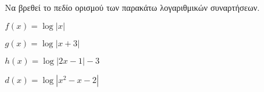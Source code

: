Να βρεθεί το πεδίο ορισμού των παρακάτω λογαριθμικών συναρτήσεων.
\begin{rlist}
\item $ f(x)=\log{|x|} $
\item $ g(x)=\log{|x+3| } $
\item $ h(x)=\log{|2x-1|-3} $
\item $ d(x)=\log{\left| x^2-x-2\right|  } $
\end{rlist}
